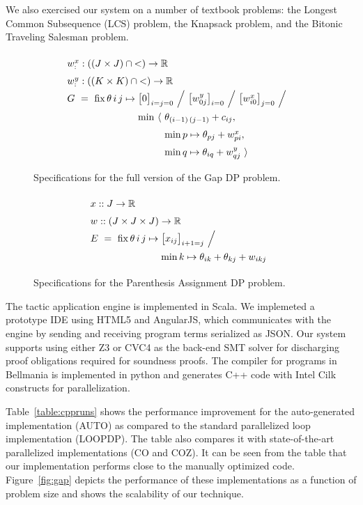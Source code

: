 \medskip
We also exercised our system on a number of textbook problems:
the Longest Common Subsequence (LCS) problem, the Knapsack problem,
and the Bitonic Traveling Salesman problem.

\begin{figure}
\[
  \renewcommand\arraystretch{1.5}
  \begin{array}{@{}l@{}l@{}l@{}}
    \lspan3{\xw :: ((J\times J)\cap{<})\to\R} \\
    \lspan3{\yw :: ((K\times K)\cap{<})\to\R} \\
    G ~=~ \fix \theta\,i\,j\mapsto{}
      & \lspan2{\big[0\big]_{i=j=0} ~\Big/~ \big[\yw{0j}\big]_{i=0} ~\Big/~ \big[\xw{i0}\big]_{j=0} ~\Big/~} \\
      & \min~\langle~ & \theta_{(i-1)\,(j-1)} + c_{ij},\\
      & & \min p\mapsto\theta_{pj}+\xw{pi}, \\
      & & \min q\mapsto\theta_{iq}+\yw{qj} ~\rangle
  \end{array}
\]
\caption{\label{evaluation:gap spec}
  Specifications for the full version of the Gap DP problem.}
\end{figure}

\begin{figure}
\[
  \renewcommand\arraystretch{1.5}
  \begin{array}{@{}l@{}l}
    \lspan2{x :: J\to\R} \\
    \lspan2{w :: (J\times J\times J)\to\R} \\
    E ~=~ \fix \theta\,i\,j\mapsto{}
      & {\big[x_{ij}\big]_{i+1=j} ~\Big/~} \\
      & \min k\mapsto\theta_{ik}+\theta_{kj}+w_{ikj} \\
  \end{array}
\]
\caption{\label{evaluation:paren spec}
  Specifications for the Parenthesis Assignment DP problem.}
\end{figure}


The tactic application engine is implemented in Scala. We implemeted a prototype
IDE using HTML5 and AngularJS, which communicates with the engine by sending
and receiving program terms serialized as JSON. Our system supports using either
Z3 or CVC4 as the back-end SMT solver for discharging proof obligations required
for soundness proofs. The compiler for programs in Bellmania is implemented in 
python and generates C++ code with Intel Cilk constructs for parallelization.


Table~\ref{table:cppruns} shows the performance improvement for the auto-generated 
implementation (AUTO) as compared to the standard parallelized loop implementation 
(LOOPDP). The table also compares it with state-of-the-art parallelized 
implementations (CO and COZ). It can be seen from the table that our 
implementation performs close to the manually optimized code. 
Figure~\ref{fig:gap} depicts the performance of these implementations 
as a function of problem size and shows the scalability of our technique. %



